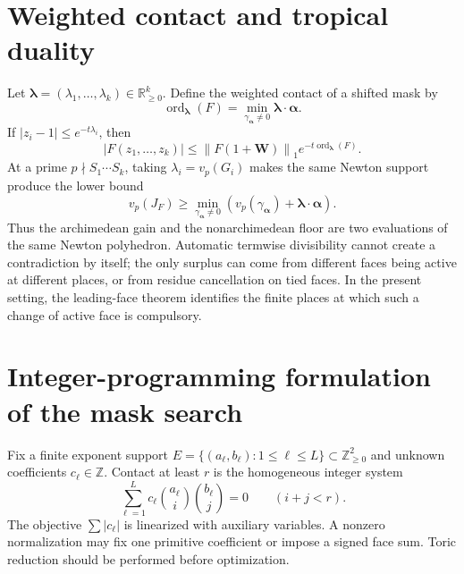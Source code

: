 \documentclass[11pt,oneside]{article}
\theoremstyle{definition}
\theoremstyle{remark}
\newcommand{\Z}{\mathbb Z}
\newcommand{\R}{\mathbb R}
\newcommand{\ord}{\operatorname{ord}}
\newcommand{\normone}[1]{\left\lVert #1\right\rVert_1}
\begin{document}
\section{Weighted contact and tropical duality}
\label{app:weighted-contact}

Let $\boldsymbol\lambda=(\lambda_1,\ldots,\lambda_k)\in\R_{\ge0}^k$.  Define the weighted
contact of a shifted mask by
\begin{equation}
 \ord_{\boldsymbol\lambda}(F)=
 \min_{\gamma_{\boldsymbol\alpha}\ne0}
 \boldsymbol\lambda\cdot\boldsymbol\alpha.
 \label{eq:weighted-contact}
\end{equation}
If $|z_i-1|\le e^{-t\lambda_i}$, then
\begin{equation}
 |F(z_1,\ldots,z_k)|
 \le\normone{F(1+\mathbf W)}e^{-t\ord_{\boldsymbol\lambda}(F)}.
 \label{eq:weighted-archimedean}
\end{equation}
At a prime $p\nmid S_1\cdots S_k$, taking
$\lambda_i=v_p(G_i)$ makes the same Newton support produce the lower bound
\begin{equation}
 v_p(J_F)\ge
 \min_{\gamma_{\boldsymbol\alpha}\ne0}
 \left(v_p(\gamma_{\boldsymbol\alpha})+
 \boldsymbol\lambda\cdot\boldsymbol\alpha\right).
 \label{eq:weighted-padic}
\end{equation}
Thus the archimedean gain and the nonarchimedean floor are two evaluations of the same Newton
polyhedron.  Automatic termwise divisibility cannot create a contradiction by itself; the
only surplus can come from different faces being active at different places, or from residue
cancellation on tied faces.  In the present setting, the leading-face theorem identifies the
finite places at which such a change of active face is compulsory.

\section{Integer-programming formulation of the mask search}
\label{app:milp}

Fix a finite exponent support
$E=\{(a_\ell,b_\ell):1\le\ell\le L\}\subset\Z_{\ge0}^2$ and unknown coefficients
$c_\ell\in\Z$.  Contact at least $r$ is the homogeneous integer system
\begin{equation}
 \sum_{\ell=1}^L c_\ell
 \binom{a_\ell}{i}\binom{b_\ell}{j}=0
 \qquad(i+j<r).
 \label{eq:milp-contact}
\end{equation}
The objective $\sum|c_\ell|$ is linearized with auxiliary variables.  A nonzero normalization
may fix one primitive coefficient or impose a signed face sum.  Toric reduction should be
performed before optimization.
\end{document}

